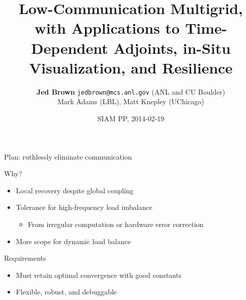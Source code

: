 \documentclass{beamer}
\title{Low-Communication Multigrid, with Applications to Time-Dependent Adjoints, in-Situ Visualization, and Resilience}
\author{{\bf Jed Brown} \texttt{jedbrown@mcs.anl.gov} (ANL and CU Boulder) \\
  \quad Mark Adams (LBL), Matt Knepley (UChicago)
}
\date{SIAM PP, 2014-02-19}
\begin{document}
\lstset{language=C}
\normalem

\begin{frame}
  \titlepage
\end{frame}

\begin{frame}{Plan: ruthlessly eliminate communication}
  \begin{block}{Why?}
    \begin{itemize}
    \item Local recovery despite global coupling
    \item Tolerance for high-frequency load imbalance
      \begin{itemize}
      \item From irregular computation or hardware error correction
      \end{itemize}
    \item More scope for dynamic load balance
    \end{itemize}
  \end{block}
  \begin{block}{Requirements}
    \begin{itemize}
    \item Must retain optimal convergence with good constants
    \item Flexible, robust, and debuggable
    \end{itemize}
  \end{block}
\end{frame}
\end{document}
